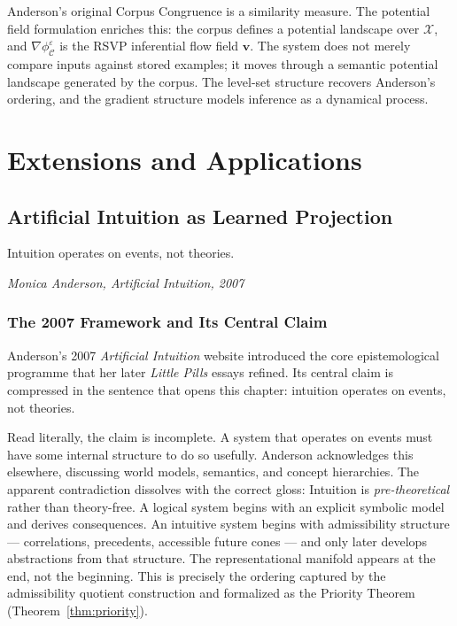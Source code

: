 \documentclass[12pt, a4paper, oneside]{book}
\newcommand{\X}{\mathcal{X}}
\newcommand{\C}{\mathcal{C}}
\newcommand{\phiCe}{\phi_{\C}^{\varepsilon}}
\newcommand{\vel}{\mathbf{v}}
\begin{document}
\begin{remark}
Anderson's original Corpus Congruence is a similarity measure. The
potential field formulation enriches this: the corpus defines a potential
landscape over $\X$, and $\nabla \phiCe$ is the RSVP inferential flow
field $\vel$. The system does not merely compare inputs against stored
examples; it moves through a semantic potential landscape generated by
the corpus. The level-set structure recovers Anderson's ordering, and the
gradient structure models inference as a dynamical process.
\end{remark}

\part{Extensions and Applications}

\chapter{Artificial Intuition as Learned Projection}
\label{ch:artificial-intuition}

\epigraph{%
  Intuition operates on events, not theories.%
}{\textit{Monica Anderson, \emph{Artificial Intuition}, 2007}}

\section{The 2007 Framework and Its Central Claim}

Anderson's 2007 \emph{Artificial Intuition} website introduced the core
epistemological programme that her later \emph{Little Pills} essays
refined. Its central claim is compressed in the sentence that opens this
chapter: intuition operates on events, not theories.

Read literally, the claim is incomplete. A system that operates on events
must have some internal structure to do so usefully. Anderson acknowledges
this elsewhere, discussing world models, semantics, and concept hierarchies.
The apparent contradiction dissolves with the correct gloss: Intuition is
\emph{pre-theoretical} rather than theory-free. A logical system begins
with an explicit symbolic model and derives consequences. An intuitive
system begins with admissibility structure --- correlations, precedents,
accessible future cones --- and only later develops abstractions from that
structure. The representational manifold appears at the end, not the
beginning. This is precisely the ordering captured by the admissibility
quotient construction and formalized as the Priority Theorem
(Theorem~\ref{thm:priority}).
\end{document}
